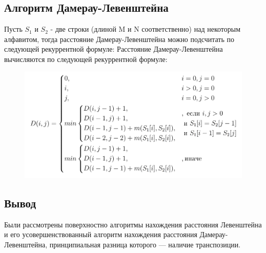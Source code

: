 \documentclass[a4paper, 12pt]{article}
\begin{document}
\begin{flushleft}
	\subsection{Алгоритм Дамерау-Левенштейна}
	\hspace*{5mm} Пусть $S_{1}$ и $S_{2}$ - две строки (длиной M и N соответственно) над некоторым алфавитом, тогда расстояние Дамерау-Левенштейна можно подсчитать по следующей рекуррентной формуле:
	Расстояние Дамерау-Левенштейна вычисляются по следующей рекуррентной формуле:
	\begin{figure}[h]
		\includegraphics[scale=0.8]{damlev}
	\end{figure}
	\subsection{Вывод}
	\hspace*{5mm} Были рассмотрены поверхностно алгоритмы нахождения расстояния Левенштейна и его усовершенствованный алгоритм нахождения расстояния Дамерау-Левенштейна, принципиальная разница которого — наличие транспозиции.
\end{flushleft}

\newpage
\end{document}

